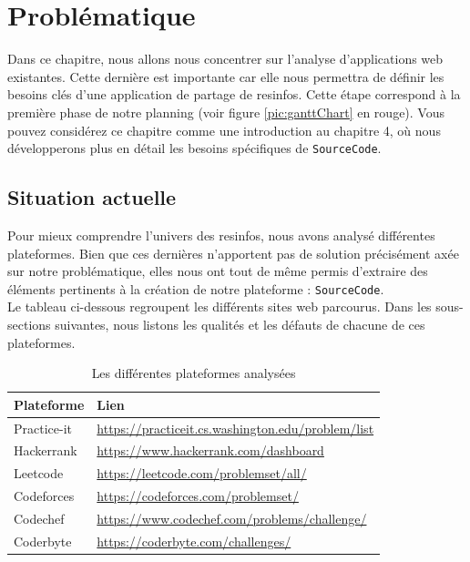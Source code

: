 \chapter{Problématique}

Dans ce chapitre, nous allons nous concentrer sur l'analyse d'applications web existantes. Cette dernière est importante car elle nous permettra de définir les besoins clés d'une application de partage de \glspl{resinfo}. Cette étape correspond à la première phase de notre planning (voir figure \ref{pic:ganttChart} en rouge). Vous pouvez considérez ce chapitre comme une introduction au chapitre 4, où nous développerons plus en détail les besoins spécifiques de \texttt{SourceCode}.

\section{Situation actuelle}

Pour mieux comprendre l'univers des \glspl{resinfo}, nous avons analysé différentes plateformes. Bien que ces dernières n'apportent pas de solution précisément axée sur notre problématique, elles nous ont tout de même permis d'extraire des éléments pertinents à la création de notre plateforme : \texttt{SourceCode}.\\

Le tableau ci-dessous regroupent les différents sites web parcourus. Dans les sous-sections suivantes, nous listons les qualités et les défauts de chacune de ces plateformes.\\

\begin{table}[H]
    \centering
    \begin{tabular}{| l | l |}
    \hline
        Plateforme & Lien \\
    \hline
        Practice-it &
        \href{https://practiceit.cs.washington.edu/problem/list}{https://practiceit.cs.washington.edu/problem/list} \\ 
    \hline
        Hackerrank &
        \href{https://www.hackerrank.com/dashboard}{https://www.hackerrank.com/dashboard} \\ 
    \hline
        Leetcode &
        \href{https://leetcode.com/problemset/all/}{https://leetcode.com/problemset/all/} \\ 
    \hline
        Codeforces &
        \href{https://codeforces.com/problemset/}{https://codeforces.com/problemset/} \\ 
    \hline
        Codechef &
        \href{https://www.codechef.com/problems/challenge/}{https://www.codechef.com/problems/challenge/} \\ 
    \hline
        Coderbyte &
        \href{https://coderbyte.com/challenges/}{https://coderbyte.com/challenges/} \\ 
    \hline
    \end{tabular}
    \caption{Les différentes plateformes analysées}
    \label{table:compPlateforme}
\end{table}

